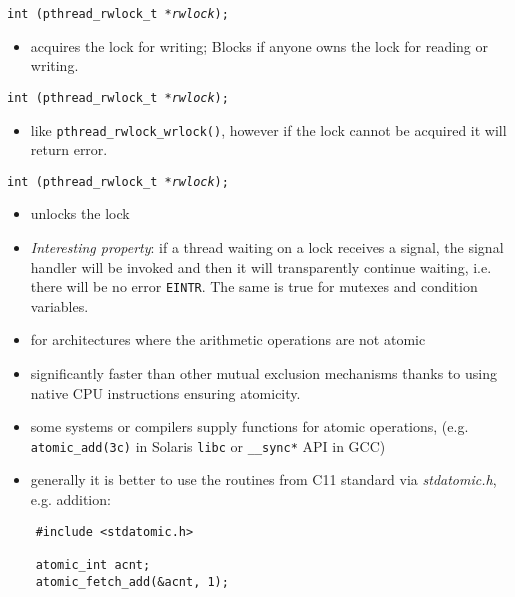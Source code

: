 

\begin{slide}
\prgchars
\texttt{int (pthread\_rwlock\_t *\emph{rwlock});}
\begin{itemize}
\item acquires the lock for writing; Blocks if anyone owns the lock for reading
or writing.
\end{itemize}
\texttt{int (pthread\_rwlock\_t *\emph{rwlock});}
\begin{itemize}
\item like \texttt{pthread\_rwlock\_wrlock()}, however if the lock cannot be
acquired it will return error.
\end{itemize}
\texttt{int (pthread\_rwlock\_t *\emph{rwlock});}
\begin{itemize}
\item unlocks the lock
\end{itemize}
\end{slide}

\begin{itemize}
\item \emph{Interesting property}: if a thread waiting on a lock receives
a signal, the signal handler will be invoked and then it will transparently
continue waiting, i.e. there will be no error \texttt{EINTR}.
The same is true for mutexes and condition variables.
\end{itemize}



\begin{slide}
\begin{itemize}
\item for architectures where the arithmetic operations are not atomic
\item significantly faster than other mutual exclusion mechanisms
thanks to using native CPU instructions ensuring atomicity.
\item some systems or compilers supply functions for atomic operations,
(e.g. \texttt{atomic\_add(3c)} in Solaris \texttt{libc} or
\texttt{\_\_sync*} API in GCC)
\item generally it is better to use the routines from C11 standard
via \emph{stdatomic.h}, e.g. addition:
\end{itemize}
\begin{verbatim}
    #include <stdatomic.h>

    atomic_int acnt;
    atomic_fetch_add(&acnt, 1);
\end{verbatim}
\end{slide}

